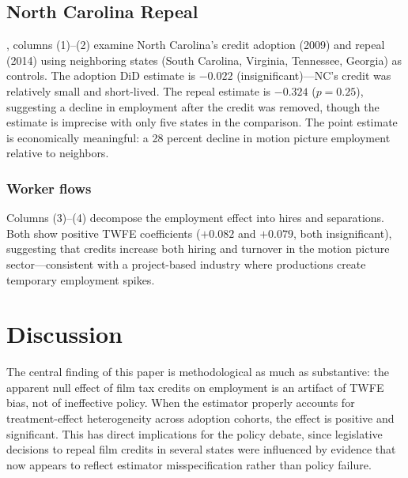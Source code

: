 \documentclass[12pt]{article}
\begin{document}
\subsection{North Carolina Repeal}



, columns (1)--(2) examine North Carolina's credit adoption (2009) and repeal (2014) using neighboring states (South Carolina, Virginia, Tennessee, Georgia) as controls. The adoption DiD estimate is $-0.022$ (insignificant)---NC's credit was relatively small and short-lived. The repeal estimate is $-0.324$ ($p = 0.25$), suggesting a decline in employment after the credit was removed, though the estimate is imprecise with only five states in the comparison. The point estimate is economically meaningful: a 28 percent decline in motion picture employment relative to neighbors.

\subsubsection*{Worker flows} Columns (3)--(4) decompose the employment effect into hires and separations. Both show positive TWFE coefficients ($+0.082$ and $+0.079$, both insignificant), suggesting that credits increase both hiring and turnover in the motion picture sector---consistent with a project-based industry where productions create temporary employment spikes.


\section{Discussion}
\label{sec:discussion}

The central finding of this paper is methodological as much as substantive: the apparent null effect of film tax credits on employment is an artifact of TWFE bias, not of ineffective policy. When the estimator properly accounts for treatment-effect heterogeneity across adoption cohorts, the effect is positive and significant. This has direct implications for the policy debate, since legislative decisions to repeal film credits in several states were influenced by evidence that now appears to reflect estimator misspecification rather than policy failure.
\end{document}
